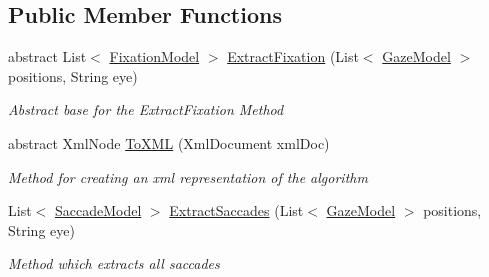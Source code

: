 \subsection*{Public Member Functions}
\begin{DoxyCompactItemize}
\item 
abstract List$<$ \hyperlink{class_web_analyzer_1_1_models_1_1_analysis_model_1_1_fixation_model}{Fixation\+Model} $>$ \hyperlink{class_web_analyzer_1_1_models_1_1_algorithm_model_1_1_algorithm_aed9ae492d1851815f79d9b2f3361711e}{Extract\+Fixation} (List$<$ \hyperlink{class_web_analyzer_1_1_models_1_1_data_model_1_1_gaze_model}{Gaze\+Model} $>$ positions, String eye)
\begin{DoxyCompactList}\small\item\em Abstract base for the Extract\+Fixation Method \end{DoxyCompactList}\item 
abstract Xml\+Node \hyperlink{class_web_analyzer_1_1_models_1_1_algorithm_model_1_1_algorithm_a84b84152621c8e87b7068bcbfeeaa1f9}{To\+X\+M\+L} (Xml\+Document xml\+Doc)
\begin{DoxyCompactList}\small\item\em Method for creating an xml representation of the algorithm \end{DoxyCompactList}\item 
List$<$ \hyperlink{class_web_analyzer_1_1_models_1_1_analysis_model_1_1_saccade_model}{Saccade\+Model} $>$ \hyperlink{class_web_analyzer_1_1_models_1_1_algorithm_model_1_1_algorithm_ac6607203b63241b68e2e4180c97de9a0}{Extract\+Saccades} (List$<$ \hyperlink{class_web_analyzer_1_1_models_1_1_data_model_1_1_gaze_model}{Gaze\+Model} $>$ positions, String eye)
\begin{DoxyCompactList}\small\item\em Method which extracts all saccades \end{DoxyCompactList}\end{DoxyCompactItemize}
